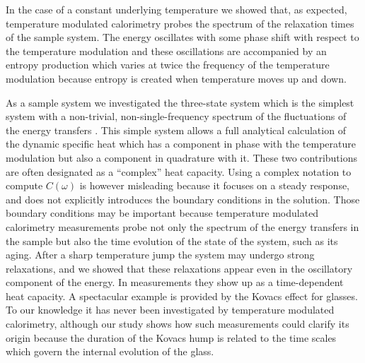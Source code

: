 \documentclass[pre,a4paper,twocolumn,superscriptaddress,%
floatfix]{revtex4}
\begin{document}
\medskip
In the case of a constant underlying temperature we showed that, as expected,
temperature modulated calorimetry probes the spectrum of the relaxation times
of the sample 
system. The energy oscillates with some phase shift with respect to the
temperature modulation and these oscillations are accompanied by an entropy
production which varies at twice the frequency of the temperature modulation
because entropy is created when temperature moves up and down.

As a sample
system we investigated the three-state system which is the simplest system
with a 
non-trivial, non-single-frequency spectrum of the fluctuations of
the energy transfers \cite{PG}.
This simple system allows a full analytical calculation of the
dynamic specific heat which has a component in phase with the temperature
modulation but also a component in quadrature with it. These two contributions
are often designated as a ``complex'' heat capacity. Using a complex notation
to compute $C(\omega)$ is however misleading because
it focuses on a steady response, and
does not explicitly introduces the boundary conditions in the solution.
Those boundary conditions may be important because
temperature modulated calorimetry measurements probe
not only the spectrum of the energy transfers in the sample but also the
time evolution of the state of the system, such as its aging. 
After a sharp temperature jump the system may undergo strong relaxations, and
we showed that these relaxations appear even in the oscillatory component of
the energy. In measurements they show up as a time-dependent heat capacity.
A spectacular example is provided by the Kovacs effect for glasses. To our
knowledge it has never been investigated by temperature modulated calorimetry,
although our 
study shows how such measurements could clarify its origin because the
duration of the Kovacs hump
is related to the time scales which govern the internal
evolution of the glass.
\end{document}
